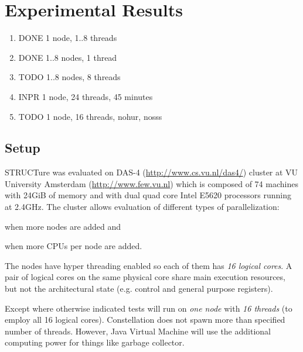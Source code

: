 \chapter{Experimental Results}
\label{chap:results}

\newcommand{\plot}[1]{
  \subfigure{
    \texttt{[image: data/all/\#1]}
  }

  \subfigure{
    \texttt{[image: data/random/\#1]}
  }

  \subfigure{
    \texttt{[image: data/nonrandom/\#1]}
  }
}

\begin{enumerate}
  \item DONE 1 node, 1..8 threads
  \item DONE 1..8 nodes, 1 thread
  \item TODO 1..8 nodes, 8 threads
  \item INPR 1 node, 24 threads, 45 minutes
  \item TODO 1 node, 16 threads, nohur, nosss
\end{enumerate}

\section{Setup}

STRUCTure was evaluated on DAS-4 (\url{http://www.cs.vu.nl/das4/})
cluster at VU University Amsterdam (\url{http://www.few.vu.nl})
which is composed of 74 machines with 24GiB of memory and with
dual quad core Intel E5620 processors running at 2.4GHz. The
cluster allows evaluation of different types of parallelization:
\begin{inparaenum}[1)]
  \item when more nodes are added and
  \item when more CPUs per node are added.
\end{inparaenum}

The nodes have hyper threading enabled so each of them has \emph{16
logical cores}. A pair of logical cores on the same physical core
share main execution resources, but not the architectural state
(e.g. control and general purpose registers).

Except where otherwise indicated tests will run on \emph{one
node} with \emph{16 threads} (to employ all 16 logical
cores). Constellation does not spawn more than specified number
of threads. However, Java Virtual Machine will use the additional
computing power for things like garbage collector.

